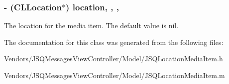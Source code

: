 \subsubsection[{location}]{\setlength{\rightskip}{0pt plus 5cm}-\/ (C\+L\+Location$\ast$) location\hspace{0.3cm}{\ttfamily [read]}, {\ttfamily [write]}, {\ttfamily [nonatomic]}, {\ttfamily [copy]}}\label{interface_j_s_q_location_media_item_afc1f1935469dc2b05605218f59fdb0a1}
The location for the media item. The default value is {\ttfamily nil}. 

The documentation for this class was generated from the following files\+:\begin{DoxyCompactItemize}
\item 
Vendors/\+J\+S\+Q\+Messages\+View\+Controller/\+Model/J\+S\+Q\+Location\+Media\+Item.\+h\item 
Vendors/\+J\+S\+Q\+Messages\+View\+Controller/\+Model/J\+S\+Q\+Location\+Media\+Item.\+m\end{DoxyCompactItemize}
